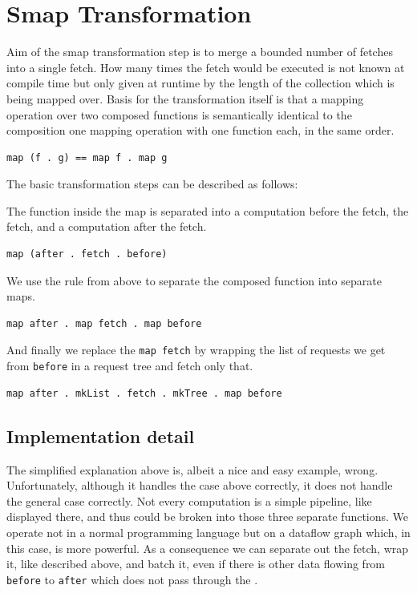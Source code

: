 \chapter{Smap Transformation}

\label{ch:smap-transformation}

Aim of the smap transformation step is to merge a bounded number of fetches into a single fetch.
How many times the fetch would be executed is not known at compile time but only given at runtime by the length of the collection which is being mapped over.
Basis for the transformation itself is that a mapping operation over two composed functions is semantically identical to the composition one mapping operation with one function each, in the same order.

\begin{verbatim}
map (f . g) == map f . map g
\end{verbatim}

The basic transformation steps can be described as follows:

The function inside the map is separated into a computation before the fetch, the fetch, and a computation after the fetch.

\begin{verbatim}
map (after . fetch . before)
\end{verbatim}

We use the rule from above to separate the composed function into separate maps.

\begin{verbatim}
map after . map fetch . map before
\end{verbatim}

And finally we replace the \texttt{map fetch} by wrapping the list of requests we get from \texttt{before} in a request tree and fetch only that.

\begin{verbatim}
map after . mkList . fetch . mkTree . map before
\end{verbatim}

\section{Implementation detail}

The simplified explanation above is, albeit a nice and easy example, wrong.
Unfortunately, although it handles the case above correctly, it does not handle the general case correctly.
Not every computation is a simple pipeline, like displayed there, and thus could be broken into those three separate functions.
We operate not in a normal programming language but on a dataflow graph which, in this case, is more powerful.
As a consequence we can separate out the fetch, wrap it, like described above, and batch it, even if there is other data flowing from \texttt{before} to \texttt{after} which does not pass through the \fetch{}.

